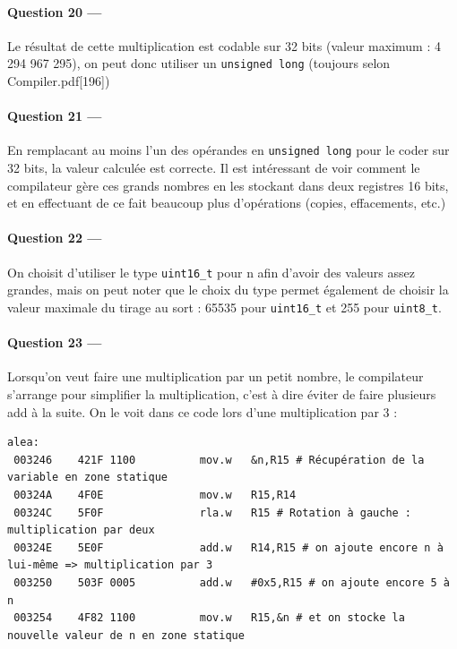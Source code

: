 \documentclass[a4paper,11pt,article]{memoir}
\begin{document}
\paragraph{Question 20 ---}  Le résultat de cette multiplication est codable sur 32 bits (valeur maximum : 4 294 967 295), on peut donc utiliser un \verb|unsigned long| (toujours selon Compiler.pdf[196])

\paragraph{Question 21 ---}  En remplacant au moins l'un des opérandes en \verb|unsigned long| pour le coder sur 32 bits, la valeur calculée est correcte. Il est intéressant de voir comment le compilateur gère ces grands nombres en les stockant dans deux registres 16 bits, et en effectuant de ce fait beaucoup plus d'opérations (copies, effacements, etc.)

\paragraph{Question 22 ---}  On choisit d'utiliser le type \verb|uint16_t| pour n afin d'avoir des valeurs assez grandes, mais on peut noter que le choix du type permet également de choisir la valeur maximale du tirage au sort : 65535 pour \verb|uint16_t| et 255 pour \verb|uint8_t|.

\paragraph{Question 23 ---}  Lorsqu'on veut faire une multiplication par un petit nombre, le compilateur s'arrange pour simplifier la multiplication, c'est à dire éviter de faire plusieurs add à la suite. On le voit dans ce code lors d'une multiplication par 3 :

\begin{verbatim}
alea:
 003246    421F 1100          mov.w   &n,R15 # Récupération de la variable en zone statique
 00324A    4F0E               mov.w   R15,R14
 00324C    5F0F               rla.w   R15 # Rotation à gauche : multiplication par deux
 00324E    5E0F               add.w   R14,R15 # on ajoute encore n à lui-même => multiplication par 3
 003250    503F 0005          add.w   #0x5,R15 # on ajoute encore 5 à n
 003254    4F82 1100          mov.w   R15,&n # et on stocke la nouvelle valeur de n en zone statique
\end{verbatim}
\end{document}

